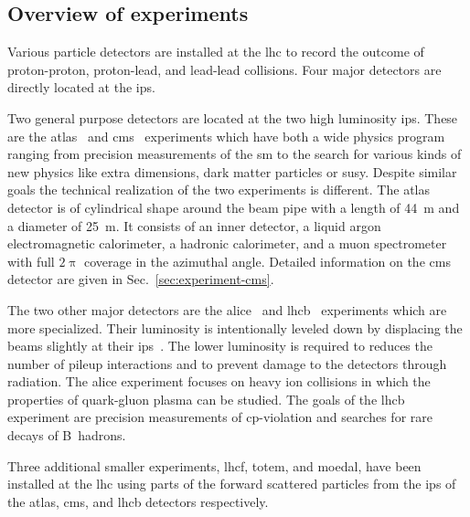 \subsection{Overview of experiments}

Various particle detectors are installed at the \gls{lhc} to record the outcome of proton-proton, proton-lead, and lead-lead collisions. Four major detectors are directly located at the \glspl{ip}. 

Two general purpose detectors are located at the two high luminosity \glspl{ip}. These are the \gls{atlas}~\cite{Aad:2008zzm} and \gls{cms}~\cite{Chatrchyan:2008aa} experiments which have both a wide physics program ranging from precision measurements of the \gls{sm} to the search for various kinds of new physics like extra dimensions, dark matter particles or \gls{susy}. Despite similar goals the technical realization of the two experiments is different. The \gls{atlas} detector is of cylindrical shape around the beam pipe with a length of 44~m and a diameter of 25~m. It consists of an inner detector, a liquid argon electromagnetic calorimeter, a hadronic calorimeter, and a muon spectrometer with full $2\uppi$ coverage in the azimuthal angle. %
Detailed information on the \gls{cms} detector are given in Sec.~\ref{sec:experiment-cms}.

The two other major detectors are the \gls{alice}~\cite{Aamodt:2008zz} and \gls{lhcb}~\cite{Alves:2008zz} experiments which are more specialized. Their luminosity is intentionally leveled down by displacing the beams slightly at their \glspl{ip}~\cite{Follin:1955354}. The lower luminosity is required to reduces the number of pileup interactions and to prevent damage to the detectors through radiation. The \gls{alice} experiment focuses on heavy ion collisions in which the properties of quark-gluon plasma can be studied. The goals of the \gls{lhcb} experiment are precision measurements of \gls{cp}-violation and searches for rare decays of B~hadrons.

Three additional smaller experiments, \gls{lhcf}, \gls{totem}, and \gls{moedal}, have been installed at the \gls{lhc} using parts of the forward scattered particles from the \glspl{ip} of the \gls{atlas}, \gls{cms}, and \gls{lhcb} detectors respectively. 


